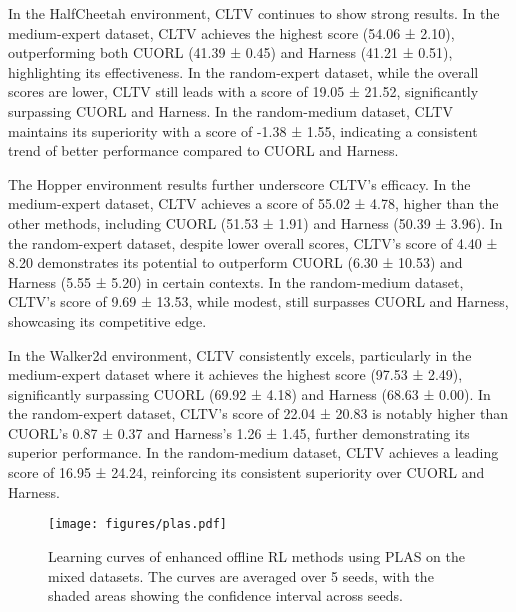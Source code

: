 In the HalfCheetah environment, CLTV continues to show strong results. In the medium-expert dataset, CLTV achieves the highest score (54.06 ± 2.10), outperforming both CUORL (41.39 ± 0.45) and Harness (41.21 ± 0.51), highlighting its effectiveness. In the random-expert dataset, while the overall scores are lower, CLTV still leads with a score of 19.05 ± 21.52, significantly surpassing CUORL and Harness. In the random-medium dataset, CLTV maintains its superiority with a score of -1.38 ± 1.55, indicating a consistent trend of better performance compared to CUORL and Harness.

The Hopper environment results further underscore CLTV’s efficacy. In the medium-expert dataset, CLTV achieves a score of 55.02 ± 4.78, higher than the other methods, including CUORL (51.53 ± 1.91) and Harness (50.39 ± 3.96). In the random-expert dataset, despite lower overall scores, CLTV's score of 4.40 ± 8.20 demonstrates its potential to outperform CUORL (6.30 ± 10.53) and Harness (5.55 ± 5.20) in certain contexts. In the random-medium dataset, CLTV’s score of 9.69 ± 13.53, while modest, still surpasses CUORL and Harness, showcasing its competitive edge.

In the Walker2d environment, CLTV consistently excels, particularly in the medium-expert dataset where it achieves the highest score (97.53 ± 2.49), significantly surpassing CUORL (69.92 ± 4.18) and Harness (68.63 ± 0.00). In the random-expert dataset, CLTV’s score of 22.04 ± 20.83 is notably higher than CUORL’s 0.87 ± 0.37 and Harness’s 1.26 ± 1.45, further demonstrating its superior performance. In the random-medium dataset, CLTV achieves a leading score of 16.95 ± 24.24, reinforcing its consistent superiority over CUORL and Harness.


\begin{figure}[!ht]
\center
\texttt{[image: figures/plas.pdf]}
\caption{Learning curves of enhanced offline RL methods using PLAS on the mixed datasets. The curves are averaged over 5 seeds, with the shaded areas showing the confidence interval across seeds.}
\label{fig-perf-plas}
\end{figure}




